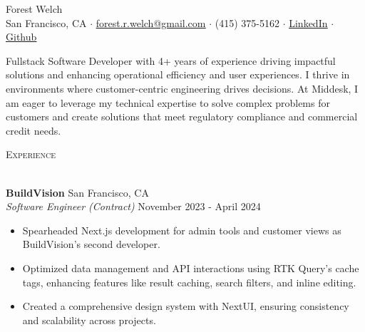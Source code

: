 \documentclass[a4paper]{article}
\newcommand{\header}[1]{
    {\hspace*{-18pt}\vspace*{3pt} \textcolor{deeppurple}{\textsc{#1}}}
    \vspace*{-12pt} \\
    \hspace*{-18pt} \textcolor{deeppurple}{\hrulefill} \\
}
\begin{document}
\vspace{-40pt}

\begin{center}
    {\fontsize{36}{36}\selectfont \textcolor{deeppurple}{Forest Welch}} \\ %
    \vspace{10pt} %
    \small San Francisco, CA $\cdot$ \href{mailto:forest.r.welch@gmail.com}{\underline{forest.r.welch@gmail.com}} $\cdot$ (415) 375-5162 $\cdot$ \href{https://linkedin.com/in/forestrwelch}{\underline{LinkedIn}} $\cdot$ \href{https://github.com/nwelchr}{\underline{Github}}
\end{center}

\begin{center}
    Fullstack Software Developer with 4+ years of experience driving impactful solutions and enhancing operational efficiency and user experiences. I thrive in environments where customer-centric engineering drives decisions. At Middesk, I am eager to leverage my technical expertise to solve complex problems for customers and create solutions that meet regulatory compliance and commercial credit needs.
\end{center}

\header{Experience}
\vspace{1mm}

\textbf{BuildVision} \hfill San Francisco, CA\\
\textit{Software Engineer (Contract)} \hfill November 2023 - April 2024\\
\vspace{-1mm}
\begin{itemize} \itemsep .5pt
    \item Spearheaded Next.js development for admin tools and customer views as BuildVision's second developer.
    \item Optimized data management and API interactions using RTK Query's cache tags, enhancing features like result caching, search filters, and inline editing.
    \item Created a comprehensive design system with NextUI, ensuring consistency and scalability across projects.
\end{itemize}
\end{document}
